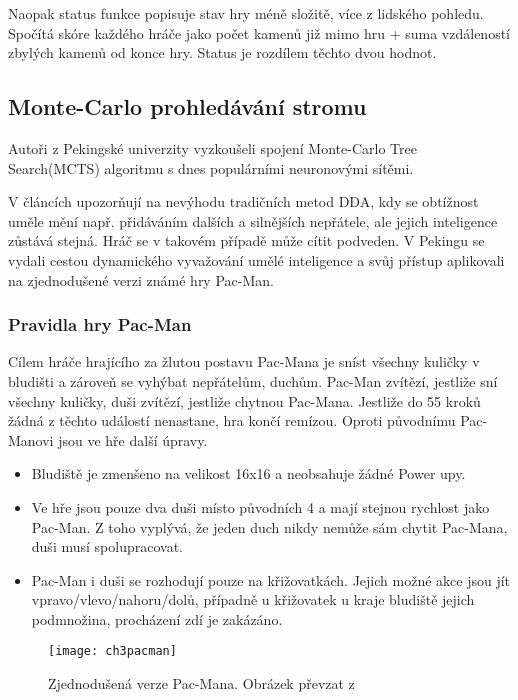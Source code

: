 Naopak status funkce popisuje stav hry méně složitě, více z lidského pohledu. Spočítá skóre každého hráče jako počet kamenů již mimo hru + suma vzdáleností zbylých kamenů od konce hry. Status je rozdílem těchto dvou hodnot.

\subsection{Monte-Carlo prohledávání stromu}

Autoři z Pekingské univerzity vyzkoušeli spojení Monte-Carlo Tree Search(MCTS) algoritmu s dnes populárními neuronovými sítěmi. \cite{18Pac1}\cite{19Pac2}

V článcích upozorňují na nevýhodu tradičních metod DDA, kdy se obtížnost uměle mění např. přidáváním dalších a silnějších nepřátele, ale jejich inteligence zůstává stejná. Hráč se v takovém případě může cítit podveden. V Pekingu se vydali cestou dynamického vyvažování umělé inteligence a svůj přístup aplikovali na zjednodušené verzi známé hry Pac-Man.

\subsubsection{Pravidla hry Pac-Man}

Cílem hráče hrajícího za žlutou postavu Pac-Mana je sníst všechny kuličky v bludišti a zároveň se vyhýbat nepřátelům, duchům. Pac-Man zvítězí, jestliže sní všechny kuličky, duši zvítězí, jestliže chytnou Pac-Mana. Jestliže do 55 kroků žádná z těchto událostí nenastane, hra končí remízou. Oproti původnímu Pac-Manovi jsou ve hře další úpravy.


\begin{itemize}
	\item Bludiště je zmenšeno na velikost 16x16 a neobsahuje žádné Power upy.
	\item Ve hře jsou pouze dva duši místo původních 4 a mají stejnou rychlost jako Pac-Man. Z toho vyplývá, že jeden duch nikdy nemůže sám chytit Pac-Mana, duši musí spolupracovat.
	\item Pac-Man i duši se rozhodují pouze na křižovatkách. Jejich možné akce jsou jít vpravo/vlevo/nahoru/dolů, případně u křižovatek u kraje bludiště jejich podmnožina, procházení zdí je zakázáno.
\end{itemize}

\begin{figure}
  \centering
  \texttt{[image: ch3pacman]}
	\caption{Zjednodušená verze Pac-Mana. Obrázek převzat z \cite{18Pac1}}
	\label{fig:ch3pacman}
\end{figure}


